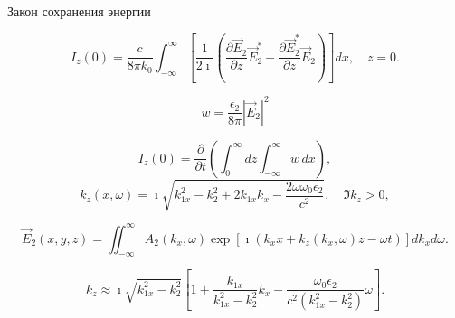 \documentclass[9pt, compress, xcolor=table]{beamer}
\begin{document}

\begin{frame}{Закон сохранения энергии}

\begin{equation*}
I_z(0) = \frac{c}{8\pi k_0} \int_{-\infty}^{\infty}  \left[ \frac{1}{2\imath} \left( \frac{\partial  {\vec E}_2}{\partial z}{\vec E}_2^* -  \frac{\partial  {\vec E}_2^*}{\partial z}{\vec E}_2 \right)  \right] dx, \quad z=0.
\end{equation*}

\begin{equation*}
w = \frac{\epsilon_2}{8\pi} |{\vec E}_2 |^2
\end{equation*}

\begin{equation*}
I_z(0) = \frac{\partial}{\partial t} \left( \int_0^{\infty} dz \int_{-\infty}^{\infty} w \, dx \right),
\end{equation*}
\begin{equation*}
k_z(x,\omega) = \imath \sqrt{ k_{1x}^2 - k_2^2 +2k_{1x}k_x - \frac{2\omega\omega_0\epsilon_2}{c^2} }, \quad \Im k_z >0,
\end{equation*}

\begin{equation*}
{\vec E}_2(x,y,z) = \iint_{-\infty}^{\infty} A_2(k_x,\omega) \exp\left[ \imath \left( k_xx + k_z(k_x,\omega)z - \omega t \right) \right]  dk_x d\omega.
\end{equation*}

\begin{equation*}
k_z \approx \imath \sqrt{k_{1x}^2-k_2^2} \left[ 1 + \frac{k_{1x}}{k_{1x}^2-k_2^2}k_x - \frac{\omega_0\epsilon_2}{c^2 (k_{1x}^2-k_2^2)}\omega \right].
\end{equation*}


\end{frame}
\end{document}
